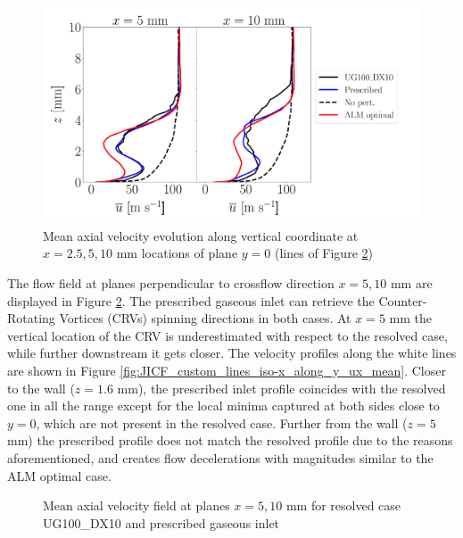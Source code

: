 \begin{figure}[ht]
\centering
   \includegraphics[scale=0.26]{./part2_developments/figures_ch6_lagrangian_JICF/gas_field_initial_conditions/custom_lines_y0_along_z_ux_mean}
\caption{Mean axial velocity evolution along vertical coordinate at $x = 2.5, 5, 10$ mm locations of plane $y = 0$ (lines of Figure \ref{fig:custom_gas_fields_plane_x}) }
\label{fig:JICF_ICS_custom_lines_y0_along_z_ux_mean}
\end{figure}
\clearpage

The flow field at planes perpendicular to crossflow direction $x = 5, 10$ mm  are displayed in Figure \ref{fig:custom_gas_fields_plane_x}. The prescribed gaseous inlet can retrieve the Counter-Rotating Vortices (CRVs) spinning directions in both cases. At $x = 5$ mm the vertical location of the CRV is underestimated with respect to the resolved case, while further downstream it gets closer. The velocity profiles along the white lines are shown in Figure \ref{fig:JICF_custom_lines_iso-x_along_y_ux_mean}.  Closer to the wall ($z = 1.6$ mm), the prescribed inlet profile coincides with the resolved one in all the range except for the local minima captured at both sides close to $y = 0$, which are not present in the resolved case. Further from the wall ($z = 5$ mm) the prescribed profile does not match the resolved profile due to the reasons aforementioned, and creates flow decelerations with magnitudes similar to the ALM optimal case. 

\begin{figure}[h!]	
	\centering	{}
	\caption{Mean axial velocity field at planes $x = 5, 10$ mm for resolved case UG100\_DX10 and prescribed gaseous inlet}
	\label{fig:custom_gas_fields_plane_x}
\end{figure}

